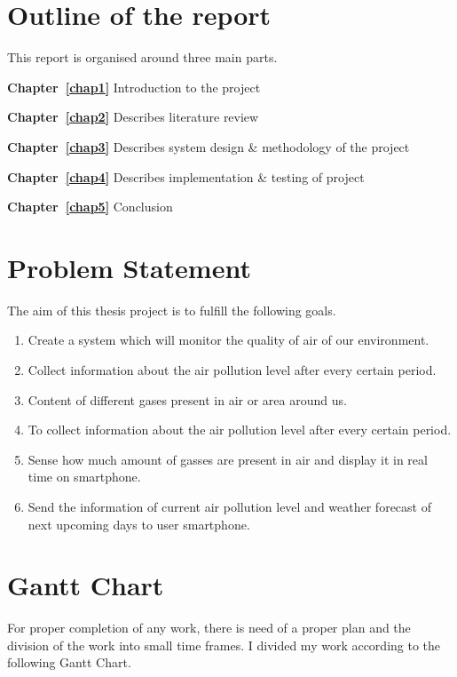 \section{Outline of the report}
This report is organised around three main parts. 

{\bf Chapter~\ref{chap1}} Introduction to the project 

{\bf Chapter~\ref{chap2}} Describes literature review
    
{\bf Chapter~\ref{chap3}} Describes system design \& methodology of the project

{\bf Chapter~\ref{chap4}} Describes implementation \& testing of project

{\bf Chapter~\ref{chap5}} Conclusion

\section{Problem Statement}
The aim of this thesis project is to fulfill the following goals.

\begin{enumerate}
\item Create a system which will monitor the quality of air of our environment.
\item Collect information about the air pollution level after every certain period.
\item Content of different gases present in air or area around us.
\item To collect information about the air pollution level after every certain period.
\item Sense how much amount of gasses are present in air and display it in real time on smartphone.
\item Send the information of current air pollution level and weather forecast of next upcoming days to user smartphone.
\end{enumerate}

\section{Gantt Chart}

For proper completion of any work, there is need of a proper plan and the division of the work into small time frames. I divided my work according to the following Gantt Chart.


